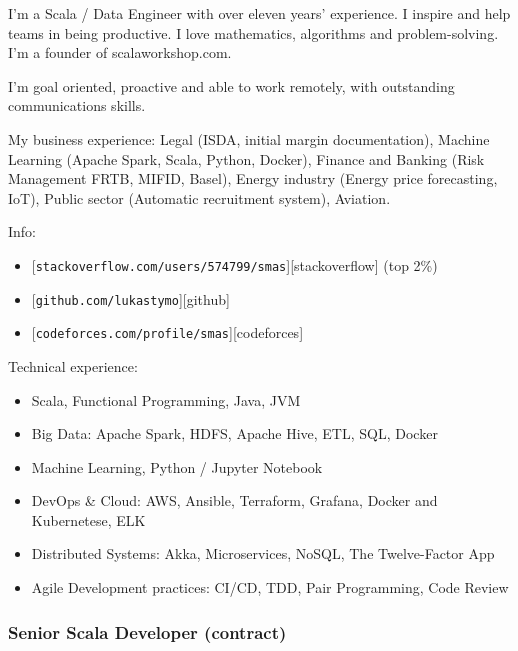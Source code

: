 \documentclass[]{rss}
\date{}
\providecommand{\tightlist}{%
  \setlength{\itemsep}{0pt}\setlength{\parskip}{0pt}}
\begin{document}
\address{\\[-9pt] lukas@codeily.com | lukastymo.com}
\begin{resume}

I'm a Scala / Data Engineer with over eleven years' experience. I
inspire and help teams in being productive. I love mathematics,
algorithms and problem-solving. I'm a founder of scalaworkshop.com.

I'm goal oriented, proactive and able to work remotely, with outstanding
communications skills.

My business experience: Legal (ISDA, initial margin documentation),
Machine Learning (Apache Spark, Scala, Python, Docker), Finance and
Banking (Risk Management FRTB, MIFID, Basel), Energy industry (Energy
price forecasting, IoT), Public sector (Automatic recruitment system),
Aviation.

Info:

\begin{itemize}
\tightlist
\item
  {[}\texttt{stackoverflow.com/users/574799/smas}{]}{[}stackoverflow{]}
  (top 2\%)
\item
  {[}\texttt{github.com/lukastymo}{]}{[}github{]}
\item
  {[}\texttt{codeforces.com/profile/smas}{]}{[}codeforces{]}
\end{itemize}

Technical experience:

\begin{itemize}
\tightlist
\item
  Scala, Functional Programming, Java, JVM
\item
  Big Data: Apache Spark, HDFS, Apache Hive, ETL, SQL, Docker
\item
  Machine Learning, Python / Jupyter Notebook
\item
  DevOps \& Cloud: AWS, Ansible, Terraform, Grafana, Docker and
  Kubernetese, ELK
\item
  Distributed Systems: Akka, Microservices, NoSQL, The Twelve-Factor App
\item
  Agile Development practices: CI/CD, TDD, Pair Programming, Code Review
\end{itemize}

\subsubsection{Senior Scala Developer
(contract)}\label{senior-scala-developer-contract}


\end{resume}
\end{document}
